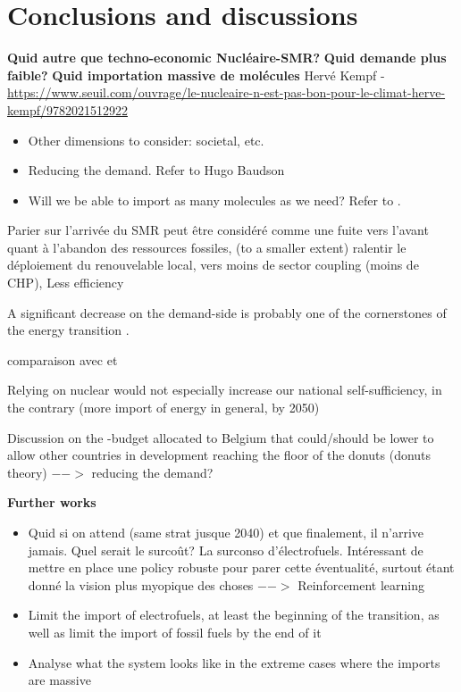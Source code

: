 \documentclass[11pt,twoside,a4paper,english]{article}
\begin{document}

\section{Conclusions and discussions}
\label{sec:conclusion}
\textbf{Quid autre que techno-economic Nucléaire-SMR?}
\textbf{Quid demande plus faible?}
\textbf{Quid importation massive de molécules}
Hervé Kempf - \url{https://www.seuil.com/ouvrage/le-nucleaire-n-est-pas-bon-pour-le-climat-herve-kempf/9782021512922}

\begin{itemize}
    \item Other dimensions to consider: societal, etc.
    \item Reducing the demand. Refer to Hugo Baudson
    \item Will we be able to import as many molecules as we need? Refer to \cite{lefebvre2022electrofuel}.
\end{itemize}

Parier sur l'arrivée du SMR peut être considéré comme une fuite vers l'avant quant à l'abandon des ressources fossiles, (to a smaller extent) ralentir le déploiement du renouvelable local, vers moins de sector coupling (moins de CHP), Less efficiency

A significant decrease on the demand-side is probably one of the cornerstones of the energy transition \cite{millward2020providing, contino_sobriety}.

comparaison avec \cite{heuberger2018impact} et \cite{PATHS2050}

Relying on nuclear would not especially increase our national self-sufficiency, in the contrary (more import of energy in general, by 2050)

Discussion on the -budget allocated to Belgium that could/should be lower to allow other countries in development reaching the floor of the donuts (donuts theory) $-->$ reducing the demand?

\textbf{Further works}
\begin{itemize}
    \item Quid si on attend (same strat jusque 2040) et que finalement, il n'arrive jamais. Quel serait le surcoût? La surconso d'électrofuels. Intéressant de mettre en place une policy robuste pour parer cette éventualité, surtout étant donné la vision plus myopique des choses $-->$ Reinforcement learning
    \item Limit the import of electrofuels, at least the beginning of the transition, as well as limit the import of fossil fuels by the end of it
    \item Analyse what the system looks like in the extreme cases where the imports are massive
\end{itemize}
\end{document}
